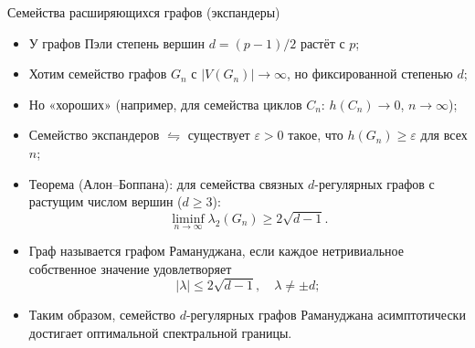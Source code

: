 \documentclass[serif, aspectratio=169]{beamer}
\begin{document}
\begin{frame}{Семейства расширяющихся графов (экспандеры)}
    \begin{itemize}
        \item У графов Пэли степень вершин $d=(p-1)/2$ растёт с $p$;
        \item Хотим семейство графов $G_n$ с $|V(G_n)|\to\infty$, но фиксированной степенью $d$;
        \item Но «хороших» (например, для семейства циклов $C_n$: $h(C_n)\to0$, $n\to\infty$);
        \item Семейство экспандеров $\leftrightharpoons$ существует $\varepsilon>0$ такое, что $h(G_n)\ge\varepsilon$ для всех $n$;
        \item Теорема (Алон--Боппана): для семейства связных $d$-регулярных графов с растущим числом вершин ($d\ge3$):
        \[\liminf_{n\to\infty}\lambda_2(G_n)\ge2\sqrt{d-1}.\]
        \item Граф называется графом Рамануджана, если каждое нетривиальное собственное значение  удовлетворяет
        \[|\lambda|\le2\sqrt{d-1},\quad \lambda\neq \pm d;\]
        \item Таким образом, семейство \(d\)-регулярных графов Рамануджана асимптотически достигает оптимальной спектральной границы.
    \end{itemize}
    \note{
        \begin{itemize}
            \item ---
        \end{itemize}
    }
\end{frame}
\end{document}
